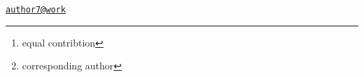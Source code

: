 \address{%
Suzanne H. Austin \footnote{equal contribtion}\\
UC Davis\\
\\
}


\address{%
Andrew S. Lang\\
UNH\\
\\
}


\address{%
Victoria S. Farrar\\
UC Davis\\
\\
}


\address{%
April Booth\\
UC Davis\\
\\
}


\address{%
Tanner Feustel\\
UC Davis\\
\\
}


\address{%
Matthew D. MacManes\\
UNH\\
\\
}


\address{%
Rebecca M. Calisi \footnote{corresponding author}\\
UC Davis\\
\\
}
\href{mailto:author7@work}{\nolinkurl{author7@work}}

